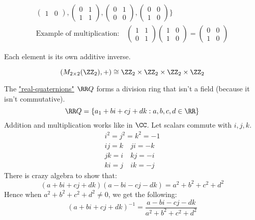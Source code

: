 \documentclass[class=scrartcl, crop=false]{standalone}
\begin{document}
\begin{definition}
\begin{example}
\begin{gather*}
\begin{pmatrix}
          1 & 0
        \end{pmatrix} ,
        \begin{pmatrix}
          0 & 1 \\
          1 & 1
        \end{pmatrix} ,
        \begin{pmatrix}
          0 & 1 \\
          0 & 0
        \end{pmatrix} ,
        \begin{pmatrix}
          0 & 0 \\
          1 & 0
        \end{pmatrix} 
      \}
      \\
      \text{Example of multiplication:}\quad
      \begin{pmatrix}
        1 & 1\\
        0 & 1
      \end{pmatrix} 
      \begin{pmatrix}
        1 & 0 \\
        1 & 0
      \end{pmatrix} 
      =
      \begin{pmatrix}
        0 & 0 \\
        1 & 0
      \end{pmatrix} 
    \end{gather*} 
  \end{example} 
  \begin{note}
    Each element is its own additive inverse.
  \end{note} 
  \[
    (M_{2 \times 2}(\ZZ_2), +) \cong \ZZ_2 \times \ZZ_2 \times \ZZ_2 \times \ZZ_2
  \]
\end{definition} 

\begin{definition}
  The \ul{"real-quaternions"} $\RR Q$ forms a division ring that isn't a field (because it isn't commutative).
  \[
    \RR Q = \{a_1 + bi + cj + dk: a, b, c, d \in \RR\}
  \]
  Addition and multiplication works like in $\CC$. Let scalars commute with $i, j, k$.
  \begin{gather*}
    i^2 = j^2 = k^2 = -1 \\
    ij = k \quad ji = -k \\
    jk = i \quad kj = -i \\
    ki = j \quad ik = -j 
  \end{gather*} 
  There is crazy algebra to show that:
  \[
    (a + bi + cj + dk)(a - bi - cj - dk) = a^2 + b^2 + c^2 + d^2
  \]
  Hence when $a^2 + b^2 + c^2 + d^2 \neq 0$, we get the following:
  \[
    (a + bi + cj + dk)^{-1} = \frac{a -bi - cj - dk}{a^2 + b^2 + c^2 + d^2}
  \]
\end{definition} 
\end{document}
